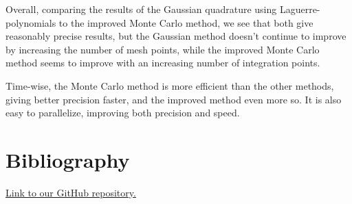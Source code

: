 \documentclass{article}
\begin{document}
	Overall, comparing the results of the Gaussian quadrature using Laguerre-polynomials to the improved Monte Carlo method, we see that both give reasonably precise results, but the Gaussian method doesn't continue to improve by increasing the number of mesh points, while the improved Monte Carlo method seems to improve with an increasing number of integration points.

	Time-wise, the Monte Carlo method is more efficient than the other methods, giving better precision faster, and the improved method even more so. It is also easy to parallelize, improving both precision and speed.

\section*{Bibliography}
	\href{https://github.com/emmernme/MENA-Compfys/tree/master/Project3}{Link to our GitHub repository.}
\end{document}
